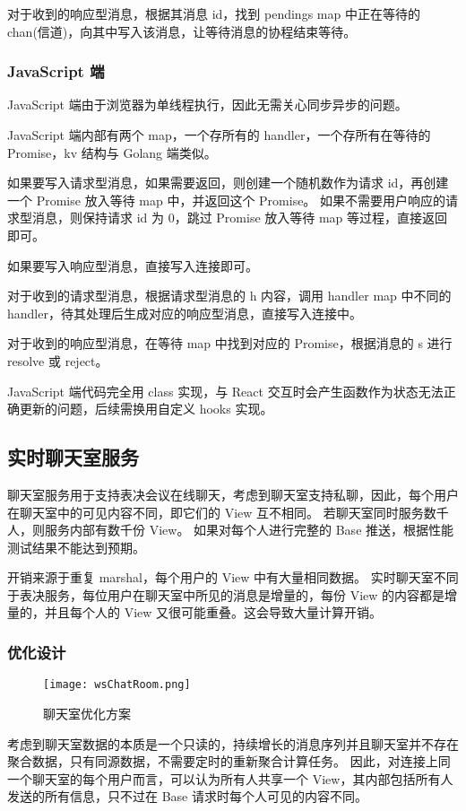 对于收到的响应型消息，根据其消息 id，找到 pendings map 中正在等待的 chan(信道)，向其中写入该消息，让等待消息的协程结束等待。

\subsubsection{JavaScript 端}
JavaScript 端由于浏览器为单线程执行，因此无需关心同步异步的问题。

JavaScript 端内部有两个 map，一个存所有的 handler，一个存所有在等待的 Promise，kv 结构与 Golang 端类似。

如果要写入请求型消息，如果需要返回，则创建一个随机数作为请求 id，再创建一个 Promise 放入等待 map 中，并返回这个 Promise。
如果不需要用户响应的请求型消息，则保持请求 id 为 0，跳过 Promise 放入等待 map 等过程，直接返回即可。

如果要写入响应型消息，直接写入连接即可。

对于收到的请求型消息，根据请求型消息的 h 内容，调用 handler map 中不同的 handler，待其处理后生成对应的响应型消息，直接写入连接中。

对于收到的响应型消息，在等待 map 中找到对应的 Promise，根据消息的 s 进行 resolve 或 reject。

JavaScript 端代码完全用 class 实现，与 React 交互时会产生函数作为状态无法正确更新的问题，后续需换用自定义 hooks 实现。

\subsection{实时聊天室服务}
聊天室服务用于支持表决会议在线聊天，考虑到聊天室支持私聊，因此，每个用户在聊天室中的可见内容不同，即它们的 View 互不相同。
若聊天室同时服务数千人，则服务内部有数千份 View。
如果对每个人进行完整的 Base 推送，根据性能测试结果不能达到预期。

开销来源于重复 marshal，每个用户的 View 中有大量相同数据。
实时聊天室不同于表决服务，每位用户在聊天室中所见的消息是增量的，每份 View 的内容都是增量的，并且每个人的 View 又很可能重叠。这会导致大量计算开销。

\subsubsection{优化设计}
\begin{figure}[!htp]
  \centering
  \texttt{[image: wsChatRoom.png]}
  \caption{聊天室优化方案}
  \label{fig:wsChatRoom}
\end{figure}
考虑到聊天室数据的本质是一个只读的，持续增长的消息序列并且聊天室并不存在聚合数据，只有同源数据，不需要定时的重新聚合计算任务。
因此，对连接上同一个聊天室的每个用户而言，可以认为所有人共享一个 View，其内部包括所有人发送的所有信息，只不过在 Base 请求时每个人可见的内容不同。


